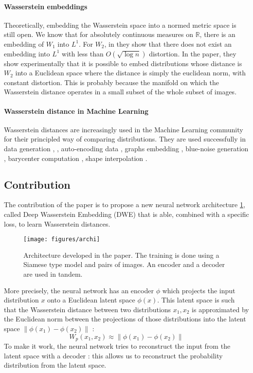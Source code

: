 \documentclass{article}
\begin{document}
\paragraph{Wasserstein embeddings} Theoretically, embedding the Wasserstein space into a normed metric space is still open. We know that for absolutely continuous measures on $\mathbb{R}$, there is an embedding of $W_1$ into $L^1$. For $W_2$, in \cite{andoni2016impossibility} they show that there does not exist an embedding into $L^1$ with less than $O(\sqrt{\log n})$ distortion. In the paper, they show experimentally that it is possible to embed distributions whose distance is $W_2$ into a Euclidean space where the distance is simply the euclidean norm, with constant distortion. This is probably because the manifold on which the Wasserstein distance operates in a small subset of the whole subset of images. 

\paragraph{Wasserstein distance in Machine Learning}
Wasserstein distances are increasingly used in the Machine Learning community for their principled way of comparing distributions. They are used successfully in data generation \cite{arjovsky2017wasserstein}, \cite{NIPS2017_7159}, auto-encoding data \cite{tolstikhin2017wasserstein}, graphs embedding \cite{zhu2018deep}, blue-noise generation \cite{de2012blue}, barycenter computation \cite{bonneel2015sliced}, shape interpolation \cite{bonneel2011displacement}.


\subsection{Contribution}

The contribution of the paper is to propose a new neural network architecture \ref{fig:archi}, called Deep Wasserstein Embedding (DWE) that is able, combined with a specific loss, to learn Wasserstein distances.

\begin{figure}[!htb]
	\centering
	\texttt{[image: figures/archi]}
	\caption{Architecture developed in the paper. The training is done using a Siamese type model and pairs of images. An encoder and a decoder are used in tandem.}
	\label{fig:archi}
\end{figure}

More precisely, the neural network has an encoder $\phi$ which projects the input distribution $x$ onto a Euclidean latent space $\phi(x)$. This latent space is such that the Wasserstein distance between two distributions $x_1, x_2$ is approximated by the Euclidean norm between the projections of those distributions into the latent space $\| \phi(x_1) - \phi(x_2) \|$ :
$$
W_p(x_1, x_2) \approx \| \phi(x_1) - \phi(x_2) \|
$$
To make it work, the neural network tries to reconstruct the input from the latent space with a decoder : this allows us to reconstruct the probability distribution from the latent space.
\end{document}
